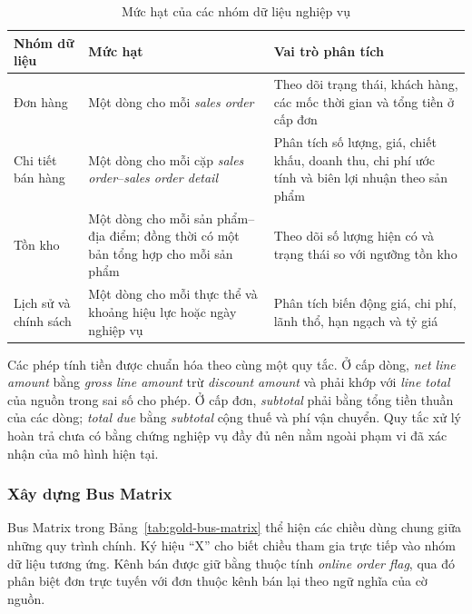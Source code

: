\begin{table}[H]\centering
\caption{Mức hạt của các nhóm dữ liệu nghiệp vụ}
\label{tab:gold-grain}
\begin{tabularx}{\textwidth}{|p{3.7cm}|p{5.2cm}|X|}\hline
\textbf{Nhóm dữ liệu} & \textbf{Mức hạt} & \textbf{Vai trò phân tích} \\ \hline
Đơn hàng & Một dòng cho mỗi \textit{sales order} & Theo dõi trạng thái, khách hàng, các mốc thời gian và tổng tiền ở cấp đơn \\ \hline
Chi tiết bán hàng & Một dòng cho mỗi cặp \textit{sales order}--\textit{sales order detail} & Phân tích số lượng, giá, chiết khấu, doanh thu, chi phí ước tính và biên lợi nhuận theo sản phẩm \\ \hline
Tồn kho & Một dòng cho mỗi sản phẩm--địa điểm; đồng thời có một bản tổng hợp cho mỗi sản phẩm & Theo dõi số lượng hiện có và trạng thái so với ngưỡng tồn kho \\ \hline
Lịch sử và chính sách & Một dòng cho mỗi thực thể và khoảng hiệu lực hoặc ngày nghiệp vụ & Phân tích biến động giá, chi phí, lãnh thổ, hạn ngạch và tỷ giá \\ \hline
\end{tabularx}
\end{table}

Các phép tính tiền được chuẩn hóa theo cùng một quy tắc. Ở cấp dòng, \textit{net line amount} bằng \textit{gross line amount} trừ \textit{discount amount} và phải khớp với \textit{line total} của nguồn trong sai số cho phép. Ở cấp đơn, \textit{subtotal} phải bằng tổng tiền thuần của các dòng; \textit{total due} bằng \textit{subtotal} cộng thuế và phí vận chuyển. Quy tắc xử lý hoàn trả chưa có bằng chứng nghiệp vụ đầy đủ nên nằm ngoài phạm vi đã xác nhận của mô hình hiện tại.

\subsubsection{Xây dựng Bus Matrix}

Bus Matrix trong Bảng~\ref{tab:gold-bus-matrix} thể hiện các chiều dùng chung giữa những quy trình chính. Ký hiệu ``X'' cho biết chiều tham gia trực tiếp vào nhóm dữ liệu tương ứng. Kênh bán được giữ bằng thuộc tính \textit{online order flag}, qua đó phân biệt đơn trực tuyến với đơn thuộc kênh bán lại theo ngữ nghĩa của cờ nguồn.

